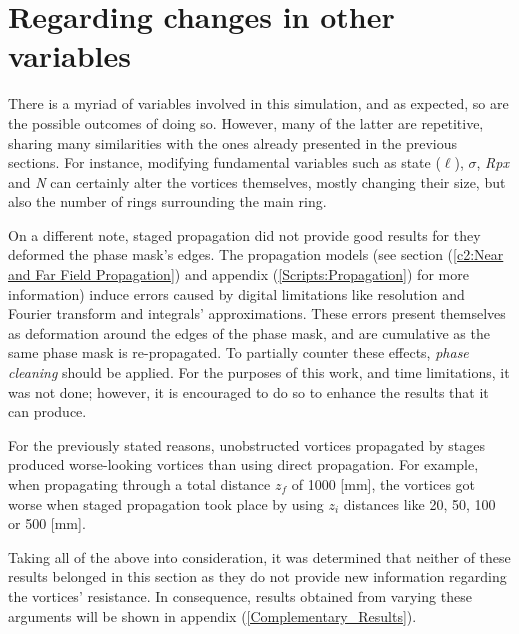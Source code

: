 \section{Regarding changes in other variables}
\label{c4:other arguments variations}

There is a myriad of variables involved in this simulation, and as expected, so are the possible outcomes of doing so. However, many of the latter are repetitive, sharing many similarities with the ones already presented in the previous sections. For instance, modifying fundamental variables such as state ($\ell$), $\sigma$, \textit{Rpx} and \textit{N} can certainly alter the vortices themselves, mostly changing their size, but also the number of rings surrounding the main ring. 

On a different note, staged propagation did not provide good results for they deformed the phase mask's edges. The propagation models (see section (\ref{c2:Near and Far Field Propagation}) and appendix (\ref{Scripts:Propagation}) for more information) induce errors caused by digital limitations like resolution and Fourier transform and integrals' approximations. These errors present themselves as deformation around the edges of the phase mask, and are cumulative as the same phase mask is re-propagated. To partially counter these effects, \textit{phase cleaning} should be applied. For the purposes of this work, and time limitations, it was not done; however, it is encouraged to do so to enhance the results that it can produce. 

For the previously stated reasons, unobstructed vortices propagated by stages produced worse-looking vortices than using direct propagation. For example, when propagating through a total distance $z_f$ of 1000 [mm], the vortices got worse when staged propagation took place by using $z_i$ distances like 20, 50, 100 or 500 [mm].

Taking all of the above into consideration, it was determined that neither of these results belonged in this section as they do not provide new information regarding the vortices' resistance. In consequence, results obtained from varying these arguments will be shown in appendix (\ref{Complementary_Results}).

